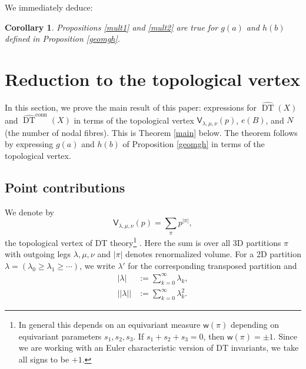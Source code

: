 \documentclass{amsart}
\newtheorem{corollary}[theorem]{Corollary}
\theoremstyle{definition}
\newcommand{\sfV}{\mathsf{V}}
\newcommand{\DT}{\operatorname{DT}}
\newcommand{\conn}{\operatorname{conn}}
\begin{document}
We immediately deduce:  
\begin{corollary} 
Propositions \ref{mult1} and \ref{mult2} are true for $g(a)$ and $h(b)$ defined in Proposition \ref{geomgh}.
\end{corollary}   
   
   
\section{Reduction to the topological vertex}  \label{vertex} 

In this section, we prove the main result of this paper: expressions for $\widehat{\DT}(X)$ and $\widehat{\DT}^{\conn}(X)$ in terms of the topological vertex $\sfV_{\lambda,\mu,\nu}(p)$, $e(B)$, and $N$ (the number of nodal fibres). This is Theorem \ref{main} below. The theorem follows by expressing $g(a)$ and $h(b)$ of Proposition \ref{geomgh} in terms of the topological vertex. 


\subsection{Point contributions}   

We denote by 
$$
\sfV_{\lambda,\mu,\nu}(p) = \sum_{\pi} p^{|\pi|}, 
$$
the topological vertex of DT theory\footnote{In general this depends on an equivariant measure $\mathsf{w}(\pi)$ depending on equivariant parameters $s_1, s_2, s_3$. If $s_1+s_2+s_3=0$, then $\mathsf{w}(\pi) = \pm 1$. Since we are working with an Euler characteristic version of DT invariants, we take all signs to be $+1$.} \cite{MNOP1, MNOP2}. Here the sum is over all 3D partitions $\pi$ with outgoing legs $\lambda, \mu, \nu$ and $|\pi|$ denotes renormalized volume. For a 2D partition $\lambda = (\lambda_0 \geq \lambda_1 \geq \cdots)$, we write $\lambda'$ for the corresponding transposed partition and 
\begin{align*}
|\lambda| &:= \sum_{k=0}^{\infty} \lambda_k, \\
|\!|\lambda|\!| &:= \sum_{k=0}^{\infty} \lambda_{k}^{2}.
\end{align*}
\end{document}

